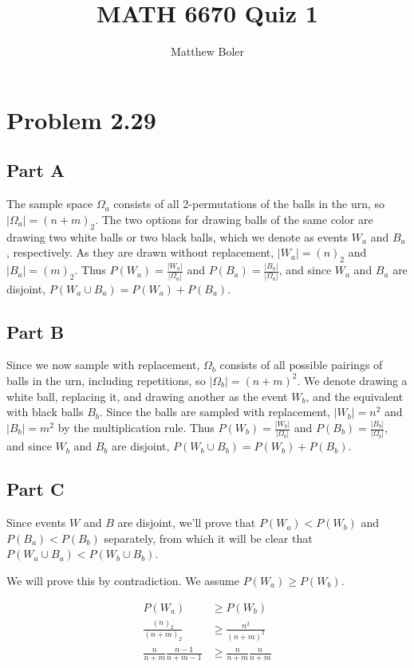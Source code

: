 \documentclass[]{article}
\title{MATH 6670 Quiz 1}
\author{Matthew Boler}
\begin{document}
\maketitle

\section{Problem 2.29}

\subsection{Part A}

The sample space $\Omega_a$ consists of all 2-permutations of the balls in the urn, so $| \Omega_a | = (n+m)_2$.
The two options for drawing balls of the same color are drawing two white balls or two black balls, which we denote as events $W_a$ and $B_a$, respectively.
As they are drawn without replacement, $| W_a | = (n)_2$ and $| B_a | = (m)_2$.
Thus $P(W_a) = \frac{|W_a|}{|\Omega_a|}$ and $P(B_a) = \frac{|B_a|}{|\Omega_a|}$, and since $W_a$ and $B_a$ are disjoint, $P(W_a \cup B_a) = P(W_a) + P(B_a)$.

\subsection{Part B}

Since we now sample with replacement, $\Omega_b$ consists of all possible pairings of balls in the urn, including repetitions, so $|\Omega_b| = (n+m)^2$.
We denote drawing a white ball, replacing it, and drawing another as the event $W_b$, and the equivalent with black balls $B_b$.
Since the balls are sampled with replacement, $|W_b| = n^2$ and $|B_b| = m^2$ by the multiplication rule.
Thus $P(W_b) = \frac{|W_b|}{|\Omega_b|}$ and $P(B_b) = \frac{|B_b|}{|\Omega_b|}$, and since $W_b$ and $B_b$ are disjoint, $P(W_b \cup B_b) = P(W_b) + P(B_b)$.

\subsection{Part C}

Since events $W$ and $B$ are disjoint, we'll prove that $P(W_a) < P(W_b)$ and $P(B_a) < P(B_b)$ separately, from which it will be clear that $P(W_a \cup B_a) < P(W_b \cup B_b)$.

We will prove this by contradiction.
We assume $P(W_a) \geq P(W_b)$.

\begin{align*}
	P(W_a) &\geq P(W_b) \\
	\frac{(n)_2}{(n+m)_2} &\geq \frac{n^2}{(n+m)^2} \\
	\frac{n}{n+m} \frac{n-1}{n+m-1} &\geq \frac{n}{n+m} \frac{n}{n+m}
\end{align*}
\end{document}
